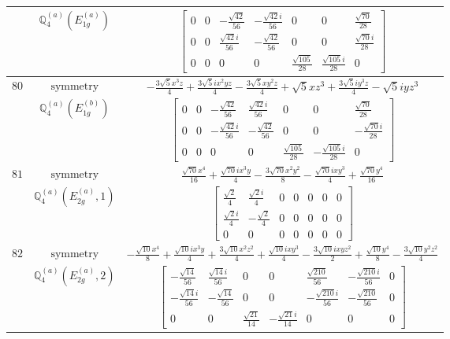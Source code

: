 \documentclass[fleqn,8pt,landscape]{jsarticle}
\begin{document}
\begin{longtable}{ccc}
$  $ & $ \mathbb{Q}_{4}^{(a)}(E_{1g}^{(a)}) $ & $ \begin{bmatrix} 0 & 0 & - \frac{\sqrt{42}}{56} & - \frac{\sqrt{42} i}{56} & 0 & 0 & \frac{\sqrt{70}}{28} \\ 0 & 0 & \frac{\sqrt{42} i}{56} & - \frac{\sqrt{42}}{56} & 0 & 0 & \frac{\sqrt{70} i}{28} \\ 0 & 0 & 0 & 0 & \frac{\sqrt{105}}{28} & \frac{\sqrt{105} i}{28} & 0 \end{bmatrix} $ \\ \hline
$ 80 $ & $ \text{symmetry} $ & $ - \frac{3 \sqrt{5} x^{3} z}{4} + \frac{3 \sqrt{5} i x^{2} y z}{4} - \frac{3 \sqrt{5} x y^{2} z}{4} + \sqrt{5} x z^{3} + \frac{3 \sqrt{5} i y^{3} z}{4} - \sqrt{5} i y z^{3} $ \\
$  $ & $ \mathbb{Q}_{4}^{(a)}(E_{1g}^{(b)}) $ & $ \begin{bmatrix} 0 & 0 & - \frac{\sqrt{42}}{56} & \frac{\sqrt{42} i}{56} & 0 & 0 & \frac{\sqrt{70}}{28} \\ 0 & 0 & - \frac{\sqrt{42} i}{56} & - \frac{\sqrt{42}}{56} & 0 & 0 & - \frac{\sqrt{70} i}{28} \\ 0 & 0 & 0 & 0 & \frac{\sqrt{105}}{28} & - \frac{\sqrt{105} i}{28} & 0 \end{bmatrix} $ \\ \hline
$ 81 $ & $ \text{symmetry} $ & $ \frac{\sqrt{70} x^{4}}{16} + \frac{\sqrt{70} i x^{3} y}{4} - \frac{3 \sqrt{70} x^{2} y^{2}}{8} - \frac{\sqrt{70} i x y^{3}}{4} + \frac{\sqrt{70} y^{4}}{16} $ \\
$  $ & $ \mathbb{Q}_{4}^{(a)}(E_{2g}^{(a)},1) $ & $ \begin{bmatrix} \frac{\sqrt{2}}{4} & \frac{\sqrt{2} i}{4} & 0 & 0 & 0 & 0 & 0 \\ \frac{\sqrt{2} i}{4} & - \frac{\sqrt{2}}{4} & 0 & 0 & 0 & 0 & 0 \\ 0 & 0 & 0 & 0 & 0 & 0 & 0 \end{bmatrix} $ \\ \hline
$ 82 $ & $ \text{symmetry} $ & $ - \frac{\sqrt{10} x^{4}}{8} + \frac{\sqrt{10} i x^{3} y}{4} + \frac{3 \sqrt{10} x^{2} z^{2}}{4} + \frac{\sqrt{10} i x y^{3}}{4} - \frac{3 \sqrt{10} i x y z^{2}}{2} + \frac{\sqrt{10} y^{4}}{8} - \frac{3 \sqrt{10} y^{2} z^{2}}{4} $ \\
$  $ & $ \mathbb{Q}_{4}^{(a)}(E_{2g}^{(a)},2) $ & $ \begin{bmatrix} - \frac{\sqrt{14}}{56} & \frac{\sqrt{14} i}{56} & 0 & 0 & \frac{\sqrt{210}}{56} & - \frac{\sqrt{210} i}{56} & 0 \\ - \frac{\sqrt{14} i}{56} & - \frac{\sqrt{14}}{56} & 0 & 0 & - \frac{\sqrt{210} i}{56} & - \frac{\sqrt{210}}{56} & 0 \\ 0 & 0 & \frac{\sqrt{21}}{14} & - \frac{\sqrt{21} i}{14} & 0 & 0 & 0 \end{bmatrix} $ \\ \hline

\end{longtable}
\end{document}
